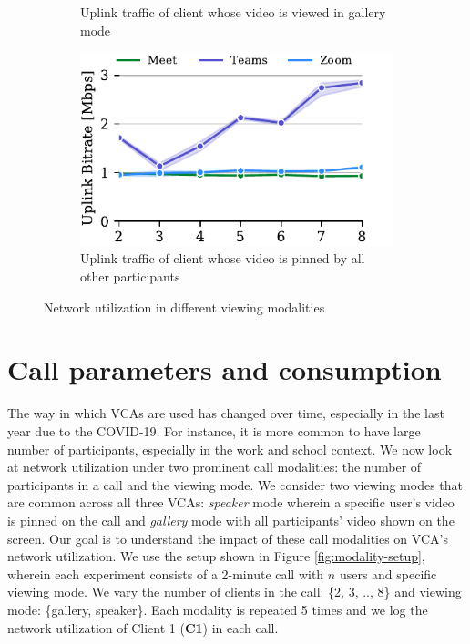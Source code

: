 \begin{figure}[ht]
\begin{subfigure}[t]{.33\textwidth}
    \caption{Uplink traffic of client whose video is viewed in gallery mode}
    \label{fig:gallery-send}
\end{subfigure}
\hfill
\begin{subfigure}[t]{.33\textwidth}
  \centering
   \captionsetup{width=.9\linewidth}
    \includegraphics[width=1\textwidth,keepaspectratio]{../figures/modality/speaker_send.pdf}
    \caption{Uplink traffic of client whose video is pinned by all other participants}
    \label{fig:speaker-send}
\end{subfigure}
\caption{Network utilization in different viewing modalities}
\label{fig:viewing-mode}
\end{figure}

\section{Call parameters and 
consumption}\label{sec:usage_modality}






The way in which VCAs are used has changed over time, especially in the last year due to the COVID-19. For instance, it is more common to have large number of participants, especially in the work and school context. We now look at network utilization under two prominent call modalities: the number of participants in a call and the viewing mode. We consider two viewing modes that are common across all three VCAs: \textit{speaker} mode wherein a specific user's video is pinned on the call and \textit{gallery} mode with all participants' video shown on the screen. Our goal is to understand the impact of these call modalities on VCA's network utilization. We use the setup shown in Figure \ref{fig:modality-setup}, wherein each experiment consists of a 2-minute call with $n$ users and specific viewing mode. We vary the number of clients in the call: \{2, 3, .., 8\} and viewing mode: \{gallery, speaker\}. Each modality is repeated 5 times and we log the network utilization of Client 1 (\textbf{C1}) in each call. 

